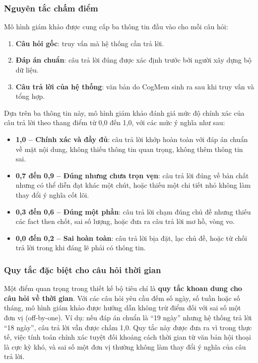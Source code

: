 \documentclass[../main.tex]{subfiles}
\begin{document}
\subsubsection{Nguyên tắc chấm điểm}

Mô hình giám khảo được cung cấp ba thông tin đầu vào cho mỗi câu hỏi:

\begin{enumerate}
    \item \textbf{Câu hỏi gốc}: truy vấn mà hệ thống cần trả lời.
    \item \textbf{Đáp án chuẩn}: câu trả lời đúng được xác định trước bởi người xây dựng bộ dữ liệu.
    \item \textbf{Câu trả lời của hệ thống}: văn bản do CogMem sinh ra sau khi truy vấn và tổng hợp.
\end{enumerate}

Dựa trên ba thông tin này, mô hình giám khảo đánh giá mức độ chính xác của câu trả lời theo thang điểm từ 0,0 đến 1,0, với các mức ý nghĩa như sau:

\begin{itemize}
    \item \textbf{1,0 -- Chính xác và đầy đủ}: câu trả lời khớp hoàn toàn với đáp án chuẩn về mặt nội dung, không thiếu thông tin quan trọng, không thêm thông tin sai.
    \item \textbf{0,7 đến 0,9 -- Đúng nhưng chưa trọn vẹn}: câu trả lời đúng về bản chất nhưng có thể diễn đạt khác một chút, hoặc thiếu một chi tiết nhỏ không làm thay đổi ý nghĩa cốt lõi.
    \item \textbf{0,3 đến 0,6 -- Đúng một phần}: câu trả lời chạm đúng chủ đề nhưng thiếu các fact then chốt, sai số lượng, hoặc đưa ra câu trả lời mơ hồ, vòng vo.
    \item \textbf{0,0 đến 0,2 -- Sai hoàn toàn}: câu trả lời bịa đặt, lạc chủ đề, hoặc từ chối trả lời trong khi đáng lẽ phải có thông tin.
\end{itemize}

\subsubsection{Quy tắc đặc biệt cho câu hỏi thời gian}

Một điểm quan trọng trong thiết kế bộ tiêu chí là \textbf{quy tắc khoan dung cho câu hỏi về thời gian}. Với các câu hỏi yêu cầu đếm số ngày, số tuần hoặc số tháng, mô hình giám khảo được hướng dẫn không trừ điểm đối với sai số một đơn vị (off-by-one). Ví dụ: nếu đáp án chuẩn là ``19 ngày'' nhưng hệ thống trả lời ``18 ngày'', câu trả lời vẫn được chấm 1,0. Quy tắc này được đưa ra vì trong thực tế, việc tính toán chính xác tuyệt đối khoảng cách thời gian từ văn bản hội thoại là cực kỳ khó, và sai số một đơn vị thường không làm thay đổi ý nghĩa của câu trả lời.
\end{document}
